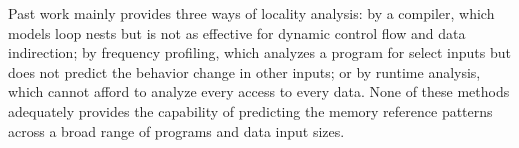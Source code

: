 \documentclass[14pt]{article}
\begin{document}
Past work mainly provides three ways of locality analysis: by a compiler, which models loop nests but is not as effective for dynamic control flow and data indirection; by frequency profiling, which analyzes a program for select inputs but does not predict the behavior change in other inputs; or by runtime analysis, which cannot afford to analyze every access to every data. None of these methods adequately provides the capability of predicting the memory reference patterns across a broad range of programs and data input sizes.
\end{document}
